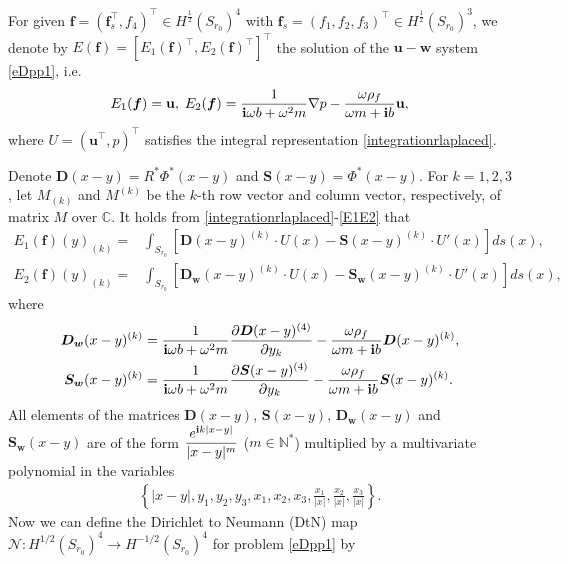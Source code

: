 \documentclass[11pt]{article}
\newcommand{\mat}{\mathbb}
\newcommand{\N}{{\mat N}}
\newcommand{\ds}{\displaystyle}
\newcommand{\pa}{\partial}
\newcommand{\bs}{\boldsymbol}
\begin{document}
For given $\bs{f}=(\bs{f}_s^{\top},f_4)^{\top}\in H^{\frac{1}{2}}(S_{r_0})^4$ with 
$\bs{f}_s=(f_1,f_2,f_3)^{\top}\in H^{\frac{1}{2}}(S_{r_0})^3$, we denote by $E(\bs{f})
=[E_1(\bs{f})^{\top},E_2(\bs{f})^{\top}]^{\top}$ the solution of the $\mathbf{u}-\mathbf{w}$ 
system \eqref{eDpp1}, i.e.
\begin{equation}\label{E1E2}
E_1(\bs{f})=\mathbf{u},\;E_2(\bs{f}) = \frac{1}{{\bf i}\omega b+\omega^2m}\nabla p-\frac{\omega\rho_f}
{\omega m+{\bf i}b}\mathbf{u},
\end{equation}
where $U=(\mathbf{u}^{\top},p)^{\top}$ satisfies the integral representation \eqref{integrationrlaplaced}.

Denote $\bs{D}(x-y)=R^*{\Phi}^*(x-y)$ and $\bs{S}(x-y)={\Phi}^*(x-y)$. For $k=1,2,3$, let $M_{(k)}$ 
and $M^{(k)}$ be the $k$-th row vector and column vector, respectively, of matrix $M$ over $\mat{C}$. 
It holds from \eqref{integrationrlaplaced}-\eqref{E1E2} that
\begin{equation}\label{E1E2_element}
\begin{aligned}
E_1(\bs{f})(y)_{(k)}=&\int_{S_{r_0}}[\bs{D}(x-y)^{(k)}\cdot U(x)-\bs{S}(x-y)^{(k)}\cdot U'(x)]ds(x), \\
E_2(\bs{f})(y)_{(k)}=&\int_{S_{r_0}}[\bs{D_w}(x-y)^{(k)}\cdot U(x)-\bs{S_w}(x-y)^{(k)}\cdot U'(x)]ds(x),
\end{aligned}
\end{equation}
where
\begin{equation*}
\begin{aligned}
\bs{D_w}(x-y)^{(k)}&=\frac{1}{{\bf i}\omega b+\omega^2m}\frac{\pa\bs{D}(x-y)^{(4)}}{\pa y_{k}}
-\frac{\omega\rho_f}{\omega m+{\bf i}b}\bs{D}(x-y)^{(k)},\\
\bs{S_w}(x-y)^{(k)}
&=\frac{1}{{\bf i}\omega b+\omega^2m}\frac{\pa\bs{S}(x-y)^{(4)}}{\pa y_{k}}-\frac{\omega\rho_f}
{\omega m+{\bf i}b}\bs{S}(x-y)^{(k)}. 
\end{aligned}
\end{equation*}
All elements of the matrices $\bs{D}(x-y)$, $\bs{S}(x-y)$, $\bs{D_w}(x-y)$ and $\bs{S_w}(x-y)$ 
are of the form $\ds\frac{e^{{\bf i}k|x-y|}}{|x-y|^m}$ ($m\in\N^*$) multiplied by a multivariate 
polynomial in the variables
$$\begin{aligned}
\left\{ |x-y|,y_1,y_2,y_3,x_1,x_2,x_3,
\frac{x_1}{|x|},\frac{x_2}{|x|},\frac{x_3}{|x|} \right\}.
\end{aligned}$$
Now we can define the Dirichlet to Neumann (DtN) map 
$\mathcal{N}:H^{1/2}(S_{r_0})^4\to H^{-1/2}(S_{r_0})^4$ for problem \eqref{eDpp1} by 
\end{document}
